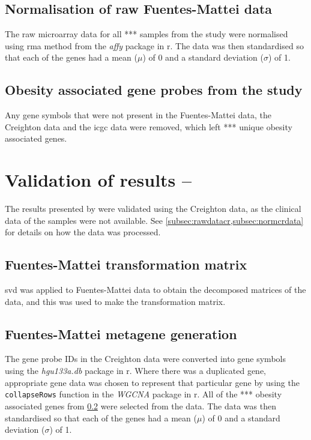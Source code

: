 \subsection{Normalisation of raw Fuentes-Mattei data}
\label{subsec:normfmdata}

The raw microarray data for all *** samples from the study were normalised using \gls{rma} method from the \textit{affy} package in \gls{r}.
The data was then standardised so that each of the genes had a mean ($\mu$) of 0 and a standard deviation ($\sigma$) of 1.

\subsection{Obesity associated gene probes from the \citet{Fuentes-Mattei2014} study}
\label{subsec:fmobsgene}

Any gene symbols that were not present in the Fuentes-Mattei data, the Creighton data and the \gls{icgc} data were removed, which left *** unique obesity associated genes.

\section{Validation of results -- \citet{Fuentes-Mattei2014}}
\label{sec:valresultsfm}

The results presented by \citet{Fuentes-Mattei2014} were validated using the Creighton data, as the clinical data of the samples were not available.
See \cref{subsec:rawdatacr,subsec:normcrdata} for details on how the data was processed.

\subsection{Fuentes-Mattei transformation matrix}
\label{subsec:transmatfm}

\gls{svd} was applied to Fuentes-Mattei data to obtain the decomposed matrices of the data, and this was used to make the transformation matrix.

\subsection{Fuentes-Mattei metagene generation}
\label{subsec:fmmetagen}

The gene probe IDs in the Creighton data were converted into gene symbols using the \textit{hgu133a.db} package in \gls{r}.
Where there was a duplicated gene, appropriate gene data was chosen to represent that particular gene by using the \texttt{collapseRows} function in the \textit{WGCNA} package in \gls{r}.
All of the *** obesity associated genes from  \cref{subsec:fmobsgene} were selected from the data.
The data was then standardised so that each of the genes had a mean ($\mu$) of 0 and a standard deviation ($\sigma$) of 1.

